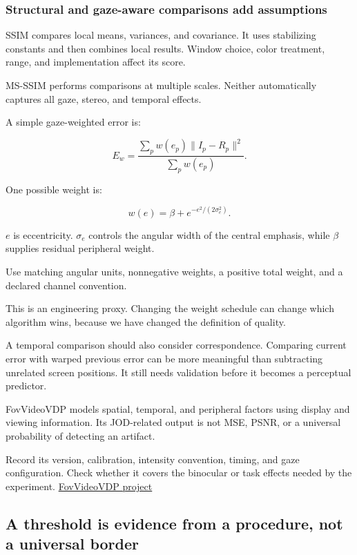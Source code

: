 \subsubsection{Structural and gaze-aware comparisons add assumptions}\label{04-visual-computing-ii-ch043-structural-and-gaze-aware-comparisons-add-assumptions}

SSIM compares local means, variances, and covariance. It uses stabilizing constants and then combines local results. Window choice, color treatment, range, and implementation affect its score.

MS-SSIM performs comparisons at multiple scales. Neither automatically captures all gaze, stereo, and temporal effects.

A simple gaze-weighted error is:

\[
E_w=
\frac{\sum_p w(e_p)\lVert I_p-R_p\rVert^2}
{\sum_p w(e_p)}.
\]

One possible weight is:

\[
w(e)=\beta+e^{-e^2/(2\sigma_e^2)}.
\]

\(e\) is eccentricity. \(\sigma_e\) controls the angular width of the central emphasis, while \(\beta\) supplies residual peripheral weight.

Use matching angular units, nonnegative weights, a positive total weight, and a declared channel convention.

This is an engineering proxy. Changing the weight schedule can change which algorithm wins, because we have changed the definition of quality.

A temporal comparison should also consider correspondence. Comparing current error with warped previous error can be more meaningful than subtracting unrelated screen positions. It still needs validation before it becomes a perceptual predictor.

FovVideoVDP models spatial, temporal, and peripheral factors using display and viewing information. Its JOD-related output is not MSE, PSNR, or a universal probability of detecting an artifact.

Record its version, calibration, intensity convention, timing, and gaze configuration. Check whether it covers the binocular or task effects needed by the experiment. \href{https://www.cl.cam.ac.uk/research/rainbow/projects/fovvideovdp/}{FovVideoVDP project}

\subsection{A threshold is evidence from a procedure, not a universal border}\label{04-visual-computing-ii-ch043-a-threshold-is-evidence-from-a-procedure-not-a-universal-border}

